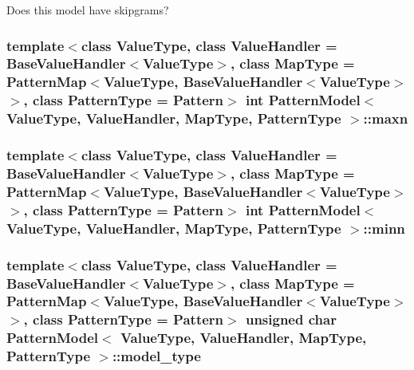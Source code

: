 Does this model have skipgrams? 

\hypertarget{classPatternModel_a9403f8a6b15d7b5bcc8f12981dbc66ff}{}
\subsubsection[{maxn}]{\setlength{\rightskip}{0pt plus 5cm}template$<$class Value\+Type, class Value\+Handler = Base\+Value\+Handler$<$\+Value\+Type$>$, class Map\+Type = Pattern\+Map$<$\+Value\+Type, Base\+Value\+Handler$<$\+Value\+Type$>$$>$, class Pattern\+Type = Pattern$>$ int {\bf Pattern\+Model}$<$ Value\+Type, Value\+Handler, Map\+Type, {\bf Pattern\+Type} $>$\+::maxn\hspace{0.3cm}{\ttfamily [protected]}}\label{classPatternModel_a9403f8a6b15d7b5bcc8f12981dbc66ff}
\hypertarget{classPatternModel_a22933685f5f30ace6099d44e65c3efb7}{}
\subsubsection[{minn}]{\setlength{\rightskip}{0pt plus 5cm}template$<$class Value\+Type, class Value\+Handler = Base\+Value\+Handler$<$\+Value\+Type$>$, class Map\+Type = Pattern\+Map$<$\+Value\+Type, Base\+Value\+Handler$<$\+Value\+Type$>$$>$, class Pattern\+Type = Pattern$>$ int {\bf Pattern\+Model}$<$ Value\+Type, Value\+Handler, Map\+Type, {\bf Pattern\+Type} $>$\+::minn\hspace{0.3cm}{\ttfamily [protected]}}\label{classPatternModel_a22933685f5f30ace6099d44e65c3efb7}
\hypertarget{classPatternModel_afd14feab6f5cebac0b02232ce3adf44b}{}
\subsubsection[{model\+\_\+type}]{\setlength{\rightskip}{0pt plus 5cm}template$<$class Value\+Type, class Value\+Handler = Base\+Value\+Handler$<$\+Value\+Type$>$, class Map\+Type = Pattern\+Map$<$\+Value\+Type, Base\+Value\+Handler$<$\+Value\+Type$>$$>$, class Pattern\+Type = Pattern$>$ unsigned char {\bf Pattern\+Model}$<$ Value\+Type, Value\+Handler, Map\+Type, {\bf Pattern\+Type} $>$\+::model\+\_\+type\hspace{0.3cm}{\ttfamily [protected]}}\label{classPatternModel_afd14feab6f5cebac0b02232ce3adf44b}
\hypertarget{classPatternModel_a512b5e8516c92983f95141d24d944f1d}{}
